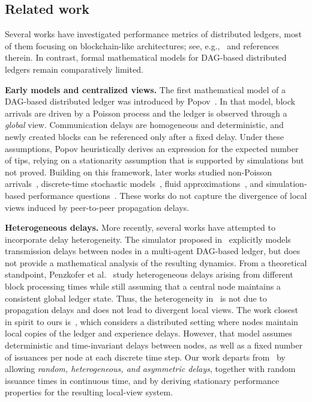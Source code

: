 \documentclass[a4paper,12pt,oneside,reqno]{amsart}
\newcommand{\1}{{\mathbf 1}}
\begin{document}
\subsection{Related work}\label{sec:relworks}

Several works have investigated performance metrics of distributed ledgers, most of them focusing on blockchain-like architectures; see, e.g.,~\cite{Caixiang2020} and references therein. In contrast, formal mathematical models for DAG-based distributed ledgers remain comparatively limited.

\textbf{Early models and centralized views.}
The first mathematical model of a DAG-based distributed ledger was introduced by Popov~\cite{popov2015}. In that model, block arrivals are driven by a Poisson process and the ledger is observed through a \emph{global} view. Communication delays are homogeneous and deterministic, and newly created blocks can be referenced only after a fixed delay. Under these assumptions, Popov heuristically derives an expression for the expected number of tips, relying on a stationarity assumption that is supported by simulations but not proved. Building on this framework, later works studied non-Poisson arrivals~\cite{li2020direct}, discrete-time stochastic models~\cite{bramas2018}, fluid approximations~\cite{ferraro2018distributed,ferraro2018iota}, and simulation-based performance questions~\cite{kusmierz2019properties,park2019performance}. These works do not capture the divergence of local views induced by peer-to-peer propagation delays.

\medskip
\textbf{Heterogeneous delays.}
More recently, several works have attempted to incorporate delay heterogeneity. The simulator proposed in~\cite{zander2019dagsim} explicitly models transmission delays between nodes in a multi-agent DAG-based ledger, but does not provide a mathematical analysis of the resulting dynamics. From a theoretical standpoint, Penzkofer et al.~\cite{penzkofer2021impact} study heterogeneous delays arising from different block processing times while still assuming that a central node maintains a consistent global ledger state. Thus, the heterogeneity in~\cite{penzkofer2021impact} is not due to propagation delays and does not lead to divergent local views. The work closest in spirit to ours is~\cite{kumar2022effect}, which considers a distributed setting where nodes maintain local copies of the ledger and experience delays. However, that model assumes deterministic and time-invariant delays between nodes, as well as a fixed number of issuances per node at each discrete time step. Our work departs from~\cite{kumar2022effect} by allowing \emph{random, heterogeneous, and asymmetric delays}, together with random issuance times in continuous time, and by deriving stationary performance properties for the resulting local-view system.
\end{document}
